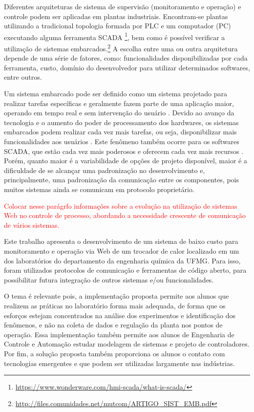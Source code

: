 	Diferentes arquiteturas de sistema de supervisão (monitoramento e operação) e controle podem ser aplicadas em plantas industriais. Encontram-se plantas utilizando a tradicional topologia formada por PLC e um computador (PC) executando alguma ferramenta SCADA \footnote{\url{https://www.wonderware.com/hmi-scada/what-is-scada/}}, bem como é possível verificar a utilização de sistemas embarcados.\footnote{\url{http://files.comunidades.net/mutcom/ARTIGO_SIST_EMB.pdf}} A escolha entre uma ou outra arquitetura depende de uma série de fatores, como: funcionalidades disponibilizadas por cada ferramenta, custo, domínio do desenvolvedor para utilizar determinados softwares, entre outros.
	
	Um sistema embarcado pode ser definido como um sistema projetado para realizar tarefas específicas e geralmente fazem parte de uma aplicação maior, operando em tempo real e sem intervenção do usuário \cite{baskiyar2005}.  Devido ao avanço da tecnologia e o aumento do poder de processamento dos hardwares, os sistemas embarcados podem realizar cada vez mais tarefas, ou seja, disponibilizar mais funcionalidades aos usuários \cite{luiz2011}. Este fenômeno também ocorre para os softwares SCADA, que estão cada vez mais poderosos e oferecem cada vez mais recursos \cite{david2017}. Porém, quanto maior é a variabilidade de opções de projeto disponível, maior é a dificuldade de se alcançar uma padronização no desenvolvimento e, principalmente, uma padronização da comunicação entre os componentes, pois muitos sistemas ainda se comunicam em protocolo proprietário.
	
	\textcolor{red}{Colocar nesse parágrfo informações sobre a evolução na utilização de sistemas Web no controle de processo, abordando a necessidade crescente de comunicação de vários sistemas.}
	
	Este trabalho apresenta o desenvolvimento de um sistema de baixo custo para monitoramento e operação via Web de um trocador de calor localizado em um dos laboratórios do departamento da engenharia química da UFMG. Para isso, foram utilizados protocolos de comunicação e ferramentas de código aberto, para possibilitar futura integração de outros sistemas e/ou funcionalidades.
	
	O tema é relevante pois, a implementação proposta permite aos alunos que realizem as práticas no laboratório forma mais adequada, de forma que os esforços estejam concentrados na análise dos experimentos e identificação dos fenômenos, e não na coleta de dados e regulação da planta nos pontos de operação. Essa implementação também permite aos alunos de Engenharia de Controle e Automação estudar modelagem de sistemas e projeto de controladores. Por fim, a solução proposta também proporciona os alunos o contato com tecnologias emergentes e que podem ser utilizadas largamente nas indústrias.  
	
